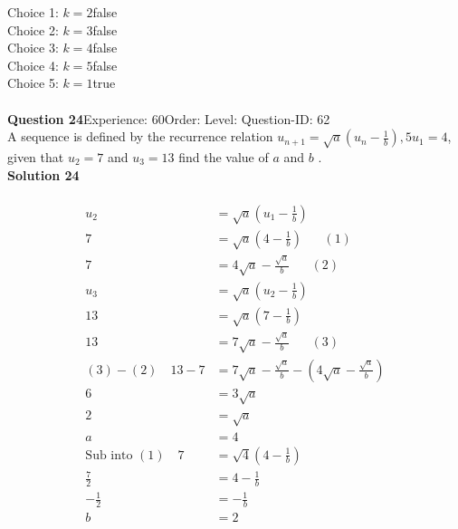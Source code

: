\documentclass{article}
\begin{document}
Choice 1: \hspace{20pt}$k=2$\hspace{20pt}false\\
Choice 2: \hspace{20pt}$k=3$\hspace{20pt}false\\
Choice 3: \hspace{20pt}$k=4$\hspace{20pt}false\\
Choice 4: \hspace{20pt}$k=5$\hspace{20pt}false\\
Choice 5: \hspace{20pt}$k=1$\hspace{20pt}true\\
\\[4pt]
\noindent\textbf{Question 24}\hspace{20pt}Experience: 60\hspace{20pt}Order: \hspace{20pt}Level: \hspace{20pt}Question-ID: 62\\[2pt]
A sequence is defined by the recurrence relation $u_{n+1}=\sqrt{a}\left(u_n-\displaystyle\frac{1}{b}\right),5 u_1=4$, given that $u_2=7$ and $u_3=13$ find the value of $a$ and $b$ .\\[4pt]
\noindent\textbf{Solution 24}\\[2pt]
\\[-35pt]\begin{align*}
u_2&=\sqrt{a}\left(u_1-\displaystyle\frac{1}{b}\right)\\[2pt]
7&=\sqrt{a}\left(4-\displaystyle\frac{1}{b}\right)\hspace{20pt}(1)\\[2pt]
7&=4\sqrt{a}-\displaystyle\frac{\sqrt{a}}{b}\hspace{20pt}(2)\\[12pt]
u_3&=\sqrt{a}\left(u_2-\displaystyle\frac{1}{b}\right)\\[2pt]
13&=\sqrt{a}\left(7-\displaystyle\frac{1}{b}\right)\\[2pt]
13&=7\sqrt{a}-\displaystyle\frac{\sqrt{a}}{b}\hspace{20pt}(3)\\[12pt]
(3)-(2)\quad13-7&=7\sqrt{a}-\displaystyle\frac{\sqrt{a}}{b}-\left(4\sqrt{a}-\displaystyle\frac{\sqrt{a}}{b}\right)\\[2pt]
6&=3\sqrt{a}\\[2pt]
2&=\sqrt{a}\\[2pt]
a&=4\\[12pt]
\text{Sub into} \,\,(1)\quad 7&=\sqrt{4}\left(4-\displaystyle\frac{1}{b}\right)\\[2pt]
\displaystyle\frac{7}{2}&=4-\displaystyle\frac{1}{b}\\[2pt]
-\displaystyle\frac{1}{2}&=-\displaystyle\frac{1}{b}\\[2pt]
b&=2
\end{align*}
\end{document}
